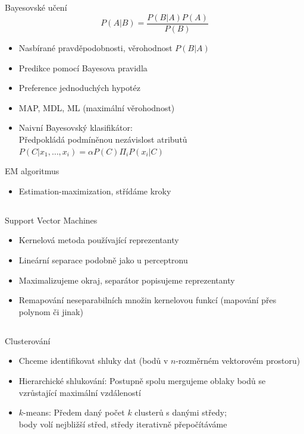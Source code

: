 \documentclass{beamer}
\begin{document}
\subsection{}
\begin{frame}{Bayesovské učení}
$$ P(A|B) = \frac{P(B|A)P(A)}{P(B)} $$
\begin{itemize}
\item Nasbírané pravděpodobnosti, věrohodnost $P(B|A)$
\item Predikce pomocí Bayesova pravidla
\item Preference jednoduchých hypotéz
\item MAP, MDL, ML (maximální věrohodnost)
\item Naivní Bayesovský klasifikátor: \\
	Předpokládá podmíněnou nezávislost atributů
	$P(C|x_1,\dots,x_i) = \alpha P(C) \Pi_i P(x_i|C)$
\end{itemize}

\begin{block}{EM algoritmus}
\begin{itemize}
\item Estimation-maximization, střídáme kroky
\end{itemize}
\end{block}
\end{frame}

\subsection{}
\begin{frame}{Support Vector Machines}
\begin{itemize}
\item Kernelová metoda používající reprezentanty
\item Lineární separace podobně jako u perceptronu
\item Maximalizujeme okraj, separátor popisujeme reprezentanty
\item Remapování neseparabilních množin kernelovou funkcí (mapování přes polynom či jinak)
\end{itemize}
\end{frame}

\subsection{}
\begin{frame}{Clusterování}
\begin{itemize}
\item Chceme identifikovat shluky dat (bodů v $n$-rozměrném vektorovém prostoru)
\item Hierarchické shlukování: Postupně spolu mergujeme oblaky bodů se vzrůstající maximální vzdáleností
\item $k$-means: Předem daný počet $k$ clusterů s danými středy; \\ body volí nejbližší střed, středy iterativně přepočítáváme
\end{itemize}
\end{frame}
\end{document}
